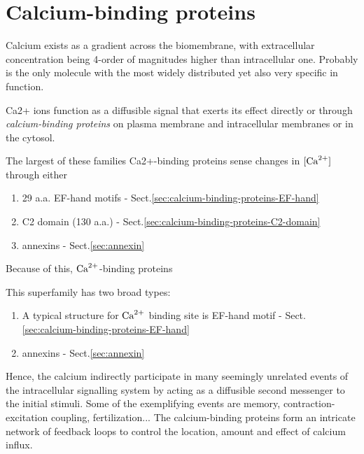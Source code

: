\section{Calcium-binding proteins}
\label{sec:calcium-binding-proteins}
\label{sec:calcium-cells}

Calcium exists as a gradient across the biomembrane, with extracellular
concentration being 4-order of magnitudes higher than intracellular one.
Probably  is the only molecule with the most widely distributed yet
also very specific in function.

Ca2+ ions function as a diffusible signal that exerts its effect directly or
through {\it calcium-binding proteins} on plasma membrane and intracellular
membranes or in the cytosol. 


The largest of these families Ca2+-binding proteins sense changes in $[{\text{Ca}^{2+}}]$
through either
\begin{enumerate}
  \item 29 a.a. EF-hand motifs -
  Sect.\ref{sec:calcium-binding-proteins-EF-hand}
  
  \item C2 domain (130 a.a.) -
  Sect.\ref{sec:calcium-binding-proteins-C2-domain} 
  
  \item annexins - Sect.\ref{sec:annexin}
  
\end{enumerate}
Because of this, ${\text{Ca}^{2+}}$-binding proteins 

This superfamily has two broad types: 
\begin{enumerate}
   \item A typical structure for ${\text{Ca}^{2+}}$ binding site is EF-hand motif -
   Sect.\ref{sec:calcium-binding-proteins-EF-hand}

   \item annexins - Sect.\ref{sec:annexin}
\end{enumerate}

Hence, the calcium indirectly participate in many seemingly unrelated events of
the intracellular signalling system by acting as a diffusible second messenger
to the initial stimuli. Some of the exemplifying events are memory,
contraction-excitation coupling, fertilization...  The calcium-binding proteins
form an intricate network of feedback loops to control the location, amount and
effect of calcium influx.

